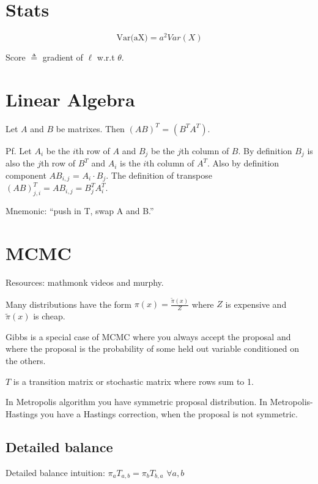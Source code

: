 \documentclass[12pt]{amsart}
\title{}
\author{}
\date{} %
\begin{document}
\maketitle
\tableofcontents

\section{Stats}

$$
\text{Var(aX)} = a^2 Var(X)
$$

Score $\triangleq$ gradient of $\ell$ w.r.t  $\theta$.

\section{Linear Algebra}

Let $A$ and $B$ be matrixes. Then $(AB)^T$ = $(B^T A^T)$. 

Pf. Let $A_i$ be the $i$th row of $A$ and $B_j$ be the $j$th column of $B$.  By definition $B_j$ is also the $j$th row of $B^T$ and $A_i$ is the $i$th column of $A^T$. Also by definition component $AB_{i,j}$ = $A_i \cdot B_j$. The definition of transpose $(AB)^T_{j,i} = AB_{i,j} = B^T_{j}A^T_i$.

Mnemonic: ``push in T, swap A and B.'' 

\section{MCMC}

Resources: mathmonk videos and murphy.

Many distributions have the form $\pi(x) = \frac{\widetilde{\pi}(x)}{Z}$ where $Z$ is expensive and $\widetilde{\pi}(x)$ is cheap.

Gibbs is a special case of MCMC where you always accept the proposal and where the proposal is the probability of some held out variable conditioned on the others.

$T$ is a transition matrix or stochastic matrix where rows sum to 1.

In Metropolis algorithm you have symmetric proposal distribution. In Metropolis-Hastings you have a Hastings correction, when the proposal is not symmetric. 

\subsection{Detailed balance}

Detailed balance intuition: $\pi_a T_{a,b} = \pi_b T_{b,a}$ $\forall a,b$
\end{document}

